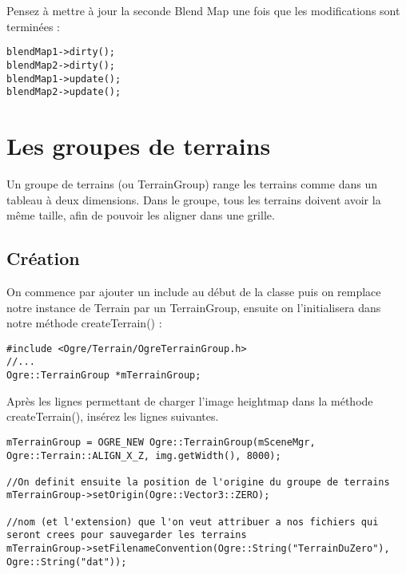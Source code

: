 Pensez \`a mettre \`a jour la seconde Blend Map une fois que les modifications sont termin\'ees :

\begin{lstlisting}[caption={}]
blendMap1->dirty();
blendMap2->dirty();
blendMap1->update();
blendMap2->update();
\end{lstlisting}








\section{Les groupes de terrains}

Un groupe de terrains (ou TerrainGroup) range les terrains comme dans un tableau \`a deux dimensions. Dans le groupe, tous les terrains doivent avoir la m\^eme taille, afin de pouvoir les aligner dans une grille.



\subsection{Cr\'eation}

On commence par ajouter un include au d\'ebut de la classe puis on remplace notre instance de Terrain par un TerrainGroup, ensuite on l'initialisera dans notre m\'ethode createTerrain() :

\begin{lstlisting}[caption={TerrainGroup: include et cr\'eation}]
#include <Ogre/Terrain/OgreTerrainGroup.h>
//...
Ogre::TerrainGroup *mTerrainGroup;
\end{lstlisting}

Apr\`es les lignes permettant de charger l'image heightmap dans la m\'ethode createTerrain(), ins\'erez les lignes suivantes.

\begin{lstlisting}[caption={}]
mTerrainGroup = OGRE_NEW Ogre::TerrainGroup(mSceneMgr, Ogre::Terrain::ALIGN_X_Z, img.getWidth(), 8000);

//On definit ensuite la position de l'origine du groupe de terrains
mTerrainGroup->setOrigin(Ogre::Vector3::ZERO);

//nom (et l'extension) que l'on veut attribuer a nos fichiers qui seront crees pour sauvegarder les terrains
mTerrainGroup->setFilenameConvention(Ogre::String("TerrainDuZero"), Ogre::String("dat"));
\end{lstlisting}

